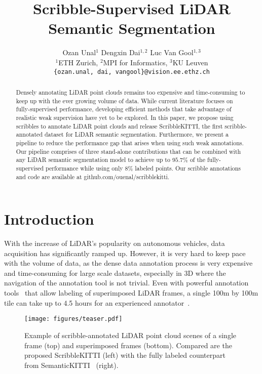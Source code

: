 \documentclass[10pt,twocolumn,letterpaper]{article}
\begin{document}
\title{Scribble-Supervised LiDAR Semantic Segmentation}

\author{
Ozan Unal$^1$ \qquad Dengxin Dai$^{1,2}$ \qquad Luc Van Gool$^{1,3}$ \\
$^1$ETH Zurich, $^2$MPI for Informatics, $^3$KU Leuven \\
{\tt\small \{ozan.unal, dai, vangool\}@vision.ee.ethz.ch}
}
\maketitle

\begin{abstract}
Densely annotating LiDAR point clouds remains too expensive and time-consuming to keep up with the ever growing volume of data. While current literature focuses on fully-supervised performance, developing efficient methods that take advantage of realistic weak supervision have yet to be explored. In this paper, we propose using scribbles to annotate LiDAR point clouds and release ScribbleKITTI, the first scribble-annotated dataset for LiDAR semantic segmentation. Furthermore, we present a pipeline to reduce the performance gap that arises when using such weak annotations. Our pipeline comprises of three stand-alone contributions that can be combined with any LiDAR semantic segmentation model to achieve up to $95.7\%$ of the fully-supervised performance while using only $8\%$ labeled points. Our scribble annotations and code are available at github.com/ouenal/scribblekitti.
\end{abstract}

\section{Introduction}

With the increase of LiDAR's popularity on autonomous vehicles, data acquisition has significantly ramped up. However, it is very hard to keep pace with the volume of data, as the dense data annotation process is very expensive and time-consuming for large scale datasets, especially in 3D where the navigation of the annotation tool is not trivial. Even with powerful annotation tools~\cite{iccv2019semantickitti} that allow labeling of superimposed LiDAR frames, a single 100m by 100m tile can take up to 4.5 hours for an experienced annotator~\cite{iccv2019semantickitti}.

\begin{figure}
    \centering
    \texttt{[image: figures/teaser.pdf]}
    \caption{Example of scribble-annotated LiDAR point cloud scenes of a single frame (top) and  superimposed frames (bottom). Compared are  the proposed ScribbleKITTI (left) with  the fully labeled counterpart from SemanticKITTI~\cite{iccv2019semantickitti} (right).}
    \label{fig:teaser}
\end{figure}
\end{document}
